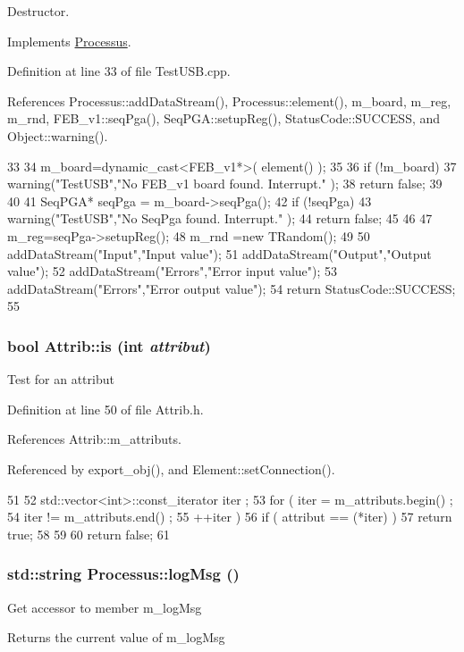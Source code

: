 Destructor. 

Implements \hyperlink{classProcessus_aee88ad7b77ae7319cf8b128e9dd2ea11}{Processus}.

Definition at line 33 of file TestUSB.cpp.

References Processus::addDataStream(), Processus::element(), m\_\-board, m\_\-reg, m\_\-rnd, FEB\_\-v1::seqPga(), SeqPGA::setupReg(), StatusCode::SUCCESS, and Object::warning().


\begin{DoxyCode}
33                                  {
34   m_board=dynamic_cast<FEB_v1*>( element() );
35   
36   if (!m_board){
37     warning("TestUSB","No FEB_v1 board found. Interrupt."  );
38     return false;
39   }
40 
41   SeqPGA* seqPga = m_board->seqPga();
42   if (!seqPga){
43     warning("TestUSB","No SeqPga found. Interrupt."  );
44     return false;
45   }
46   
47   m_reg=seqPga->setupReg();
48   m_rnd =new TRandom();
49 
50   addDataStream("Input","Input value");
51   addDataStream("Output","Output value");
52   addDataStream("Errors","Error input value");
53   addDataStream("Errors","Error output value");
54   return StatusCode::SUCCESS;
55 }
\end{DoxyCode}
\hypertarget{classAttrib_a704f26af560909ad22065083bb7d4c34}{
\subsubsection[{is}]{\setlength{\rightskip}{0pt plus 5cm}bool Attrib::is (int {\em attribut})}}
\label{classAttrib_a704f26af560909ad22065083bb7d4c34}
Test for an attribut 

Definition at line 50 of file Attrib.h.

References Attrib::m\_\-attributs.

Referenced by export\_\-obj(), and Element::setConnection().


\begin{DoxyCode}
51   {
52     std::vector<int>::const_iterator iter ;
53     for ( iter  = m_attributs.begin() ;
54           iter != m_attributs.end()   ;
55           ++iter ) {
56       if ( attribut == (*iter) ) {
57         return true;
58       }
59     }
60     return false;
61   }
\end{DoxyCode}
\hypertarget{classProcessus_a42fdeb17dc13ba854222666b6aa29b61}{
\subsubsection[{logMsg}]{\setlength{\rightskip}{0pt plus 5cm}std::string Processus::logMsg ()}}
\label{classProcessus_a42fdeb17dc13ba854222666b6aa29b61}
Get accessor to member m\_\-logMsg \begin{DoxyReturn}{Returns}
the current value of m\_\-logMsg 
\end{DoxyReturn}


